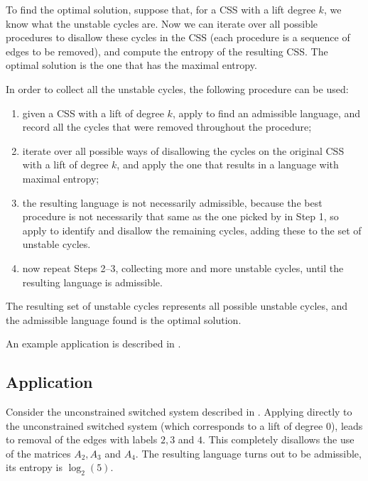 \documentclass[11pt,twoside,a4paper,openright]{uclouvain-thesis}
\begin{document}
To find the optimal solution, suppose that, for a CSS with a lift degree $k$, we know what the unstable cycles are.
Now we can iterate over all possible procedures to disallow these cycles in the CSS (each procedure is a sequence of edges to be removed), and compute the entropy of the resulting CSS.
The optimal solution is the one that has the maximal entropy.

In order to collect all the unstable cycles, the following procedure can be used:
\begin{enumerate}
\item given a CSS with a lift of degree $k$, apply  to find an admissible language, and record all the cycles that were removed throughout the procedure;
\item iterate over all possible ways of disallowing the cycles on the original CSS with a lift of degree $k$, and apply the one that results in a language with maximal entropy;
\item the resulting language is not necessarily admissible, because the best procedure is not necessarily that same as the one picked by  in Step 1, so apply  to identify and disallow the remaining cycles, adding these to the set of unstable cycles.
\item now repeat Steps 2--3, collecting more and more unstable cycles, until the resulting language is admissible.
\end{enumerate}

The resulting set of unstable cycles represents all possible unstable cycles, and the admissible language found is the optimal solution.

An example application is described in .



\subsection{Application}
\label{sec:application}

Consider the unconstrained switched system described in \cite[Section~4]{gomes2018minimally}.
Applying  directly to the unconstrained switched system (which corresponds to a lift of degree 0), leads to removal of the edges with labels $2, 3$ and $4$.
This completely disallows the use of the matrices $A_2, A_3$ and $A_4$.
The resulting language turns out to be admissible, its entropy is $\log_2(5)$.
\end{document}
